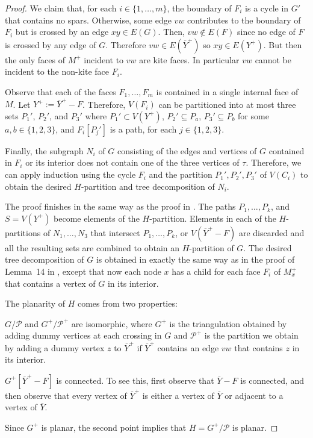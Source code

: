 \documentclass{patmorin}
\begin{document}
\begin{proof}
	We claim that, for each $i\in\{1,\ldots,m\}$, the boundary of $F_i$ is a cycle in $G'$ that contains no spars. Otherwise, some edge $vw$ contributes to the boundary of $F_i$ but is crossed by an edge $xy\in E(G)$. Then, $vw\not\in E(F)$ since no edge of $F$ is crossed by any edge of $G$. Therefore $vw\in E(\overline{Y}^+)$ so $xy\in E(Y^+)$. But then the only faces of $M^+$ incident to $vw$ are kite faces.  In particular $vw$ cannot be incident to the non-kite face $F_i$.
	
	Observe that each of the faces $F_1,\ldots,F_m$ is contained in a single internal face of $M$.   Let $Y^+ := \overline{Y}^+-F$. Therefore, $V(F_i)$ can be partitioned into at most three sets $P_1'$, $P_2'$, and $P_3'$ where $P_1'\subset V(Y^+)$, $P_2'\subseteq P_a$, $P_3'\subseteq P_b$ for some $a,b\in\{1,2,3\}$, and $F_i[P_j']$ is a path, for each $j\in\{1,2,3\}$.
	
	Finally, the subgraph $N_i$ of $G$ consisting of the edges and vertices of $G$ contained in $F_i$ or its interior does not contain one of the three vertices of $\tau$. Therefore, we can apply induction using the cycle $F_i$ and the partition $P_1',P_2',P_3'$ of $V(C_i)$ to obtain the desired $H$-partition and tree decomposition of $N_i$.
	
	The proof finishes in the same way as the proof in \cite{dujmovic.joret.ea:planar}.  The paths $P_1,\ldots,P_k$, and $S=V(Y^+)$ become elements of the $H$-partition.
	Elements in each of the $H$-partitions of $N_1,\ldots,N_3$ that intersect $P_1,\ldots,P_k$, or $V(\overline{Y}^+-F)$ are discarded and all the resulting sets are combined to obtain an $H$-partition of $G$.  The desired tree decomposition of $G$ is obtained in exactly the same way as in the proof of Lemma~14 in \cite{dujmovic.joret.ea:planar}, except that now each node $x$ has a child for each face $F_i$ of $M^+_x$ that contains a vertex of $G$ in its interior.
	
	The planarity of $H$ comes from two properties:
	\begin{compactenum}
		\item $G/\mathcal{P}$ and $G^+/\mathcal{P^+}$ are isomorphic, where $G^+$ is the triangulation obtained by adding dummy vertices at each crossing in $G$ and $\mathcal{P}^+$ is the partition we obtain by adding a dummy vertex $z$ to $\overline{Y}^+$ if $\overline{Y}^+$ contains an edge $vw$ that contains $z$ in its interior.
		
		\item $G^+[\overline{Y}^+-F]$ is connected. To see this, first observe that $\overline{Y}-F$ is connected, and then observe that every vertex of $\overline{Y}^+$ is either a vertex of $\overline{Y}$ or adjacent to a vertex of $\overline{Y}$.
	\end{compactenum}
	Since $G^+$ is planar, the second point implies that $H=G^+/\mathcal{P}$ is planar.
\end{proof}
\end{document}
